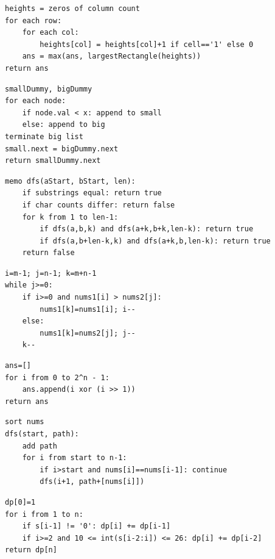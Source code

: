 \documentclass[11pt,a4paper]{ctexart}
\begin{document}
\begin{verbatim}
heights = zeros of column count
for each row:
    for each col:
        heights[col] = heights[col]+1 if cell=='1' else 0
    ans = max(ans, largestRectangle(heights))
return ans
\end{verbatim}

\begin{verbatim}
smallDummy, bigDummy
for each node:
    if node.val < x: append to small
    else: append to big
terminate big list
small.next = bigDummy.next
return smallDummy.next
\end{verbatim}

\begin{verbatim}
memo dfs(aStart, bStart, len):
    if substrings equal: return true
    if char counts differ: return false
    for k from 1 to len-1:
        if dfs(a,b,k) and dfs(a+k,b+k,len-k): return true
        if dfs(a,b+len-k,k) and dfs(a+k,b,len-k): return true
    return false
\end{verbatim}

\begin{verbatim}
i=m-1; j=n-1; k=m+n-1
while j>=0:
    if i>=0 and nums1[i] > nums2[j]:
        nums1[k]=nums1[i]; i--
    else:
        nums1[k]=nums2[j]; j--
    k--
\end{verbatim}

\begin{verbatim}
ans=[]
for i from 0 to 2^n - 1:
    ans.append(i xor (i >> 1))
return ans
\end{verbatim}

\begin{verbatim}
sort nums
dfs(start, path):
    add path
    for i from start to n-1:
        if i>start and nums[i]==nums[i-1]: continue
        dfs(i+1, path+[nums[i]])
\end{verbatim}

\begin{verbatim}
dp[0]=1
for i from 1 to n:
    if s[i-1] != '0': dp[i] += dp[i-1]
    if i>=2 and 10 <= int(s[i-2:i]) <= 26: dp[i] += dp[i-2]
return dp[n]
\end{verbatim}
\end{document}
